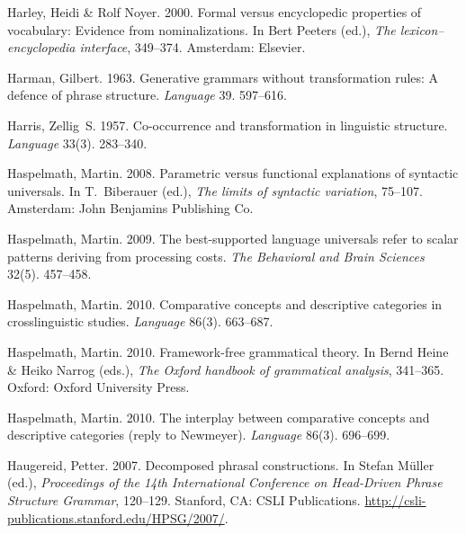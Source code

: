\begin{thebibliography}{1420}
Harley, Heidi \& Rolf Noyer. 2000.
\newblock Formal versus encyclopedic properties of vocabulary: {Evidence} from
  nominalizations.
\newblock In Bert Peeters (ed.), \emph{The lexicon--encyclopedia interface},
  349--374. Amsterdam: Elsevier.

Harman, Gilbert. 1963.
\newblock Generative grammars without transformation rules: {A} defence of
  phrase structure.
\newblock \emph{Language} 39. 597--616.

Harris, Zellig~S. 1957.
\newblock Co-occurrence and transformation in linguistic structure.
\newblock \emph{Language} 33(3). 283--340.

Haspelmath, Martin. 2008.
\newblock Parametric versus functional explanations of syntactic universals.
\newblock In T.~Biberauer (ed.), \emph{The limits of syntactic variation},
  75--107. Amsterdam: John Benjamins Publishing Co.

Haspelmath, Martin. 2009.
\newblock The best-supported language universals refer to scalar patterns
  deriving from processing costs.
\newblock \emph{The Behavioral and Brain Sciences} 32(5). 457--458.

Haspelmath, Martin. 2010{}.
\newblock Comparative concepts and descriptive categories in crosslinguistic
  studies.
\newblock \emph{Language} 86(3). 663--687.

Haspelmath, Martin. 2010{}.
\newblock Framework-free grammatical theory.
\newblock In Bernd Heine \& Heiko Narrog (eds.), \emph{The {Oxford} handbook of
  grammatical analysis}, 341--365. Oxford: Oxford University Press.

Haspelmath, Martin. 2010{}.
\newblock The interplay between comparative concepts and descriptive categories
  (reply to {Newmeyer}).
\newblock \emph{Language} 86(3). 696--699.

Haugereid, Petter. 2007.
\newblock Decomposed phrasal constructions.
\newblock In Stefan M{\"u}ller (ed.), \emph{Proceedings of the {14th
  International Conference on Head-Driven Phrase Structure Grammar}}, 120--129.
  Stanford, CA: CSLI Publications.
\newblock \urlprefix\url{http://csli-publications.stanford.edu/HPSG/2007/}.


\end{thebibliography}

